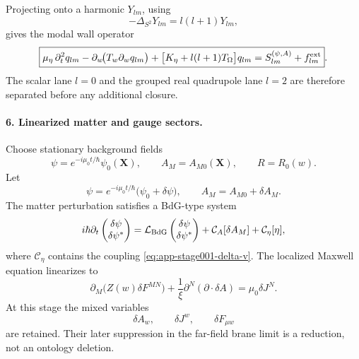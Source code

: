 Projecting onto a harmonic \(Y_{lm}\), using
\begin{equation}
-\Delta_{S^2}Y_{lm}=l(l+1)Y_{lm},
\end{equation}
gives the modal wall operator
\begin{equation}
\label{eq:app-stage001-modal-wall-pde}
\boxed{
\mu_\eta\,\partial_t^2q_{lm}
-\partial_w\!\bigl(T_w\partial_wq_{lm}\bigr)
+\bigl[K_\eta+l(l+1)T_\Omega\bigr]q_{lm}
=S_{lm}^{(\psi,A)}+f_{lm}^{\rm ext}}.
\end{equation}
The scalar lane \(l=0\) and the grouped real quadrupole lane \(l=2\) are therefore separated before any additional closure.

\paragraph{6. Linearized matter and gauge sectors.}
Choose stationary background fields
\begin{equation}
\psi=e^{-i\mu_0t/\hbar}\psi_0(\mathbf X),
\qquad
A_M=A_{M0}(\mathbf X),
\qquad
R=R_0(w).
\end{equation}
Let
\begin{equation}
\psi=e^{-i\mu_0t/\hbar}\bigl(\psi_0+\delta\psi\bigr),
\qquad
A_M=A_{M0}+\delta A_M.
\end{equation}
The matter perturbation satisfies a BdG-type system
\begin{equation}
\label{eq:app-stage001-bdg-schematic}
i\hbar\partial_t
\begin{pmatrix}\delta\psi\\ \delta\psi^*\end{pmatrix}
=\mathcal L_{\rm BdG}
\begin{pmatrix}\delta\psi\\ \delta\psi^*\end{pmatrix}
+\mathcal C_A[\delta A_M]
+\mathcal C_\eta[\eta],
\end{equation}
where \(\mathcal C_\eta\) contains the coupling \eqref{eq:app-stage001-delta-v}.  The localized Maxwell equation linearizes to
\begin{equation}
\label{eq:app-stage001-linear-maxwell}
\boxed{
\partial_M\bigl(Z(w)\delta F^{MN}\bigr)
+\frac1\xi\partial^N(\partial\!\cdot\!\delta A)
=\mu_0\delta J^N}.
\end{equation}
At this stage the mixed variables
\begin{equation}
\delta A_w,
\qquad
\delta J^w,
\qquad
\delta F_{\mu w}
\end{equation}
are retained.  Their later suppression in the far-field brane limit is a reduction, not an ontology deletion.

